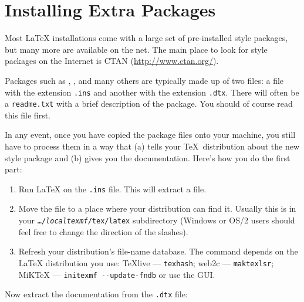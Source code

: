 \section{Installing Extra Packages}\label{sec:Packages}

Most \LaTeX{} installations come with a large set of pre-installed
style packages, but many more are available on the net. The main
place to look for style packages on the Internet is CTAN (\url{http://www.ctan.org/}).

Packages such as , , and many
others are typically made up of two files: a file with the extension
\texttt{.ins} and another with the extension \texttt{.dtx}. There
will often be a \texttt{readme.txt} with a brief description of the
package. You should of course read this file first.

In any event, once you have copied the package files onto your
machine, you still have to process them in a way that (a) tells your
\TeX\ distribution about the new style package and (b) gives you
the documentation.  Here's how you do the first part:

\begin{enumerate}
  \item Run \LaTeX{} on the \texttt{.ins} file. This will
        extract a  file.
  \item Move the  file to a place where your distribution
        can find it. Usually this is in your \texttt{\ldots/\emph{localtexmf}/tex/latex}
        subdirectory (Windows or OS/2 users should feel free to change the
        direction of the slashes).
  \item Refresh your distribution's file-name database. The command
        depends on the \LaTeX{} distribution you use:
        \TeX{}live --- \texttt{texhash}; web2c --- \texttt{maktexlsr};
        MiK\TeX{} --- \texttt{initexmf -{}-update-fndb} or use the GUI\@.
\end{enumerate}

\noindent Now extract the documentation from the
\texttt{.dtx} file:

